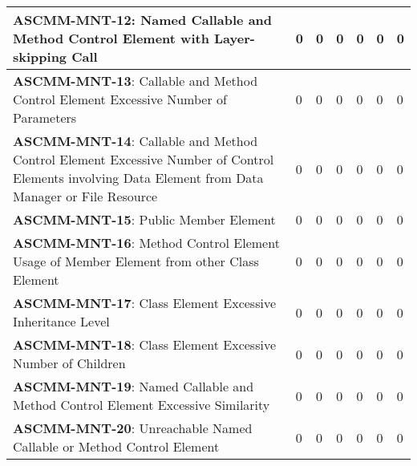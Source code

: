 \documentclass[openany,10pt,a4paper]{article}
\begin{document}
\begin{table}[h]
\begin{tabular}{|p{3in}|p{0.3in}|p{0.3in}|p{0.3in}|p{0.3in}|p{0.3in}|p{0.4in}|}
\textbf{ASCMM-MNT-12}: Named Callable and Method Control Element with Layer-skipping Call & 0 & 0 & 0 & 0 & 0 & 0 \\ \hline
\textbf{ASCMM-MNT-13}: Callable and Method Control Element Excessive Number of Parameters & 0 & 0 & 0 & 0 & 0 & 0 \\ \hline
\textbf{ASCMM-MNT-14}: Callable and Method Control Element Excessive Number of Control Elements involving Data Element from Data Manager or File Resource & 0 & 0 & 0 & 0 & 0 & 0 \\ \hline
\textbf{ASCMM-MNT-15}: Public Member Element & 0 & 0 & 0 & 0 & 0 & 0 \\ \hline
\textbf{ASCMM-MNT-16}: Method Control Element Usage of Member Element from other Class Element & 0 & 0 & 0 & 0 & 0 & 0 \\ \hline
\textbf{ASCMM-MNT-17}: Class Element Excessive Inheritance Level & 0 & 0 & 0 & 0 & 0 & 0 \\ \hline
\textbf{ASCMM-MNT-18}: Class Element Excessive Number of Children & 0 & 0 & 0 & 0 & 0 & 0 \\ \hline
\textbf{ASCMM-MNT-19}: Named Callable and Method Control Element Excessive Similarity & 0 & 0 & 0 & 0 & 0 & 0 \\ \hline
\textbf{ASCMM-MNT-20}: Unreachable Named Callable or Method Control Element & 0 & 0 & 0 & 0 & 0 & 0 \\ \hline
	\end{tabular} 
	\label{tab:tabela1}
\end{table}
\end{document}
